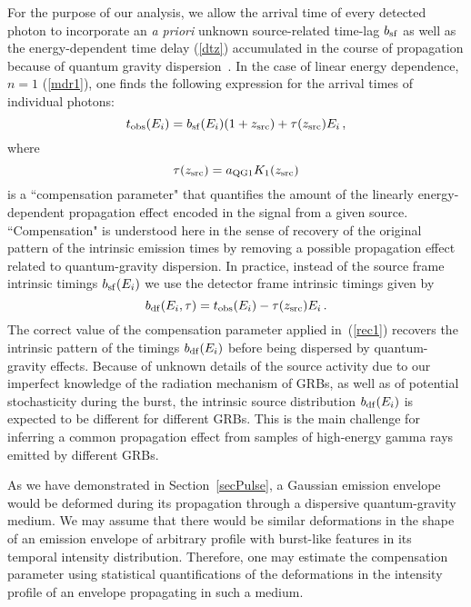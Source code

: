 \documentclass[12pt]{article}
\newcommand{\beq}{\begin{equation}}
\newcommand{\eeq}{\end{equation}}
\begin{document}
For the purpose of our analysis, we allow the arrival time of every detected photon
to incorporate an {\it a priori} unknown source-related time-lag $b_{\rm sf}$ as well as
the energy-dependent time delay (\ref{dtz}) accumulated in the course of propagation because of
quantum gravity dispersion~\cite{EMNSS}. In the case of linear energy dependence, $n=1$ (\ref{mdr1}),
one finds the following expression for the arrival times of
individual photons:
\beq
t_{\rm obs}(E_i) = b_{\rm sf}(E_i)(1+z_{\rm src})+\tau(z_{\rm src})E_i \, ,
\label{lag1}
\eeq
where
\beq
\label{tauK1}
\tau(z_{\rm src}) = a_{\rm QG1}K_1(z_{\rm src})
\eeq
is a ``compensation parameter" that quantifies the amount of the linearly energy-dependent
propagation effect encoded in the signal from a given source. ``Compensation" is understood here
in the sense of recovery of the original pattern of the intrinsic emission times by removing a possible propagation
effect related to quantum-gravity dispersion. In practice, instead of the source frame intrinsic
timings $b_{\rm sf}(E_i)$ we use the detector frame intrinsic timings given by
\beq
b_{\rm df}(E_i,\tau) = t_{\rm obs}(E_i) - \tau(z_{\rm src})E_i \, .
\label{rec1}
\eeq
The correct value of the compensation parameter
applied in~(\ref{rec1}) recovers the intrinsic pattern of the timings $b_{\rm df}(E_i)$
before being dispersed by quantum-gravity effects.
Because of unknown details of the source activity due to our imperfect knowledge of the radiation mechanism
of GRBs, as well as of potential stochasticity during the burst,
the intrinsic source distribution $b_{\rm df}(E_i)$ is expected
to be different for different GRBs. This is the main challenge for inferring a common
propagation effect from samples of high-energy gamma rays emitted by different GRBs.

As we have demonstrated in Section~\ref{secPulse}, a Gaussian emission envelope would be deformed during its
propagation through a dispersive quantum-gravity medium.
We may assume that there would be similar deformations in the shape of an emission
envelope of arbitrary profile with burst-like features in its temporal intensity distribution.
Therefore, one may estimate the compensation parameter using statistical quantifications of
the deformations in the intensity profile of an envelope propagating in such a medium.
\end{document}
